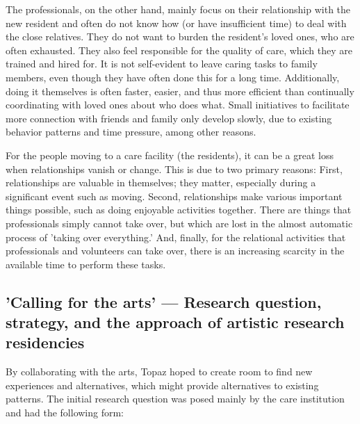 \documentclass[authordate, empirical]{jote-new-article}
\begin{document}
	The professionals, on the other hand, mainly focus on their relationship with the new resident and often do not know how (or have insufficient time) to deal with the close relatives. They do not want to burden the resident's loved ones, who are often exhausted. They also feel responsible for the quality of care, which they are trained and hired for. It is not self-evident to leave caring tasks to family members, even though they have often done this for a long time. Additionally, doing it themselves is often faster, easier, and thus more efficient than continually coordinating with loved ones about who does what. Small initiatives to facilitate more connection with friends and family only develop slowly, due to existing behavior patterns and time pressure, among other reasons.







	For the people moving to a care facility (the residents), it can be a great loss when relationships vanish or change. This is due to two primary reasons: First, relationships are valuable in themselves; they matter, especially during a significant event such as moving. Second, relationships make various important things possible, such as doing enjoyable activities together. There are things that professionals simply cannot take over, but which are lost in the almost automatic process of 'taking over everything.' And, finally, for the relational activities that professionals and volunteers can take over, there is an increasing scarcity in the available time to perform these tasks.







	\subsection{'Calling for the arts' — Research question, strategy, and the approach of artistic research residencies}







	By collaborating with the arts, Topaz hoped to create room to find new experiences and alternatives, which might provide alternatives to existing patterns. The initial research question was posed mainly by the care institution and had the following form:
\end{document}
